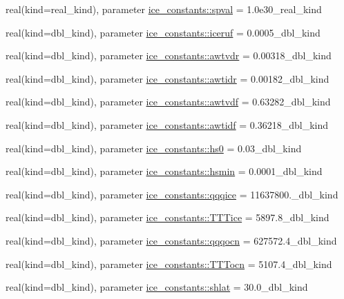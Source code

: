 \begin{DoxyCompactItemize}
\item 
real(kind=real\_\-kind), parameter \hyperlink{namespaceice__constants_a9c8695ae78220caf5148da03217658d9}{ice\_\-constants::spval} = 1.0e30\_\-real\_\-kind
\item 
real(kind=dbl\_\-kind), parameter \hyperlink{namespaceice__constants_ac29badea7fe3d80ca6d1de8376b17836}{ice\_\-constants::iceruf} = 0.0005\_\-dbl\_\-kind
\item 
real(kind=dbl\_\-kind), parameter \hyperlink{namespaceice__constants_a54bc2a8589e9b5c12512590fc9171b91}{ice\_\-constants::awtvdr} = 0.00318\_\-dbl\_\-kind
\item 
real(kind=dbl\_\-kind), parameter \hyperlink{namespaceice__constants_aee8c086e084aac138032d1c7c0a67c6a}{ice\_\-constants::awtidr} = 0.00182\_\-dbl\_\-kind
\item 
real(kind=dbl\_\-kind), parameter \hyperlink{namespaceice__constants_a24c072f6d6610938c97469566905b897}{ice\_\-constants::awtvdf} = 0.63282\_\-dbl\_\-kind
\item 
real(kind=dbl\_\-kind), parameter \hyperlink{namespaceice__constants_a0b473656091f340d3c9f721dec4fad43}{ice\_\-constants::awtidf} = 0.36218\_\-dbl\_\-kind
\item 
real(kind=dbl\_\-kind), parameter \hyperlink{namespaceice__constants_afb193f4389586bacd30b4382b1ca21c5}{ice\_\-constants::hs0} = 0.03\_\-dbl\_\-kind
\item 
real(kind=dbl\_\-kind), parameter \hyperlink{namespaceice__constants_aabb18cc60f80f91072acd8182b2776af}{ice\_\-constants::hsmin} = 0.0001\_\-dbl\_\-kind
\item 
real(kind=dbl\_\-kind), parameter \hyperlink{namespaceice__constants_a99597a5a1a0a2eb223e155e209b95538}{ice\_\-constants::qqqice} = 11637800.\_\-dbl\_\-kind
\item 
real(kind=dbl\_\-kind), parameter \hyperlink{namespaceice__constants_abca4267cd2edc853a5213d463487c28f}{ice\_\-constants::TTTice} = 5897.8\_\-dbl\_\-kind
\item 
real(kind=dbl\_\-kind), parameter \hyperlink{namespaceice__constants_a6768cc2f1ba89cd471ab5fd955e839c1}{ice\_\-constants::qqqocn} = 627572.4\_\-dbl\_\-kind
\item 
real(kind=dbl\_\-kind), parameter \hyperlink{namespaceice__constants_a79068c1f0079cf6a81045ae75ef7d30f}{ice\_\-constants::TTTocn} = 5107.4\_\-dbl\_\-kind
\item 
real(kind=dbl\_\-kind), parameter \hyperlink{namespaceice__constants_a899f02a446bdd286d3047a7bd80f6dec}{ice\_\-constants::shlat} = 30.0\_\-dbl\_\-kind

\end{DoxyCompactItemize}
